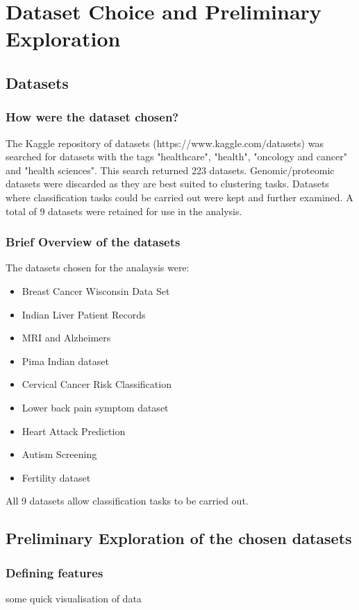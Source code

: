\section{Dataset Choice and Preliminary Exploration}
\subsection{Datasets}
\subsubsection{How were the dataset chosen?}
The Kaggle repository of datasets (https://www.kaggle.com/datasets) was searched for datasets with the tags "healthcare", "health", "oncology and cancer" and "health sciences".
This search returned 223 datasets. Genomic/proteomic datasets were discarded as they are best suited to clustering tasks. Datasets where classification tasks could be carried out were kept and further examined.
A total of 9 datasets were retained for use in the analysis.

\subsubsection{Brief Overview of the datasets}
The datasets chosen for the analaysis were:
\begin{itemize}
    \item Breast Cancer Wisconsin Data Set
    \item Indian Liver Patient Records
    \item MRI and Alzheimers
    \item Pima Indian dataset
    \item Cervical Cancer Risk Classification
    \item Lower back pain symptom dataset
    \item Heart Attack Prediction
    \item Autism Screening
    \item Fertility dataset
\end{itemize}

All 9 datasets allow classification tasks to be carried out. 

\subsection{Preliminary Exploration of the chosen datasets}
\subsubsection{Defining features}
some quick visualisation of data 
